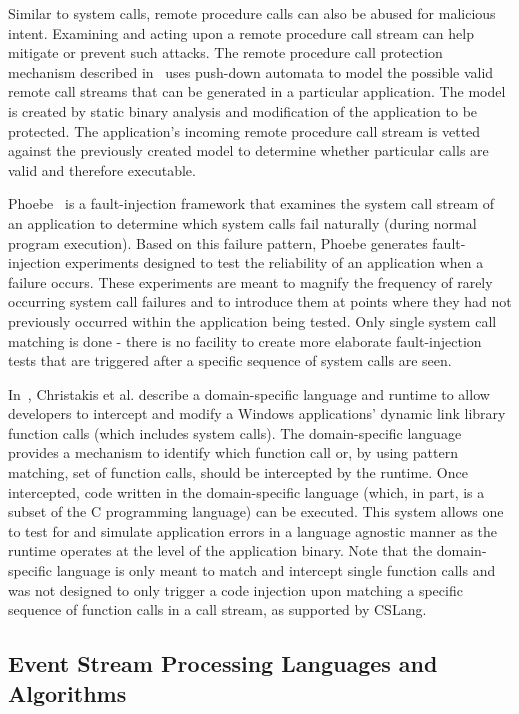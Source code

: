 Similar to system calls, remote procedure calls can also be abused for malicious intent.
Examining and acting upon a remote procedure call stream can help mitigate or prevent such attacks.
The remote procedure call protection mechanism described in~\cite{DBLP:conf/uss/GiffinJM02} uses push-down automata to model the possible valid remote call streams that can be generated in a particular application.
The model is created by static binary analysis and modification of the application to be protected.
The application's incoming remote procedure call stream is vetted against the previously created model to determine whether particular calls are valid and therefore executable.

Phoebe~\cite{DBLP:journals/corr/abs-2006-04444} is a fault-injection framework that examines
the system call stream of an application to determine which system calls fail
naturally (during normal program execution). Based on this failure pattern,
Phoebe generates fault-injection experiments designed to test the reliability of
an application when a failure occurs. These experiments are meant to magnify the
frequency of rarely occurring system call failures and to introduce them at
points where they had not previously occurred within the application being
tested. Only single system call matching is done - there is no facility to create
more elaborate fault-injection tests that are triggered after a specific
sequence of system calls are seen.

In~\cite{DBLP:conf/icse/ChristakisEG017}, Christakis et al. describe a domain-specific language and runtime to allow developers to intercept and modify a Windows applications’ dynamic link library function calls (which includes system calls). The domain-specific language provides a mechanism to identify which function call or, by using pattern matching, set of function calls, should be intercepted by the runtime. Once intercepted, code written in the domain-specific language (which, in part, is a subset of the C programming language) can be executed. This system allows one to test for and simulate application errors in a language agnostic manner as the runtime operates at the level of the application binary. Note that the domain-specific language is only meant to match and intercept single function calls and was not designed to only trigger a code injection upon matching a specific sequence of function calls in a call stream, as supported by CSLang. 

\subsection{Event Stream Processing Languages and Algorithms}

